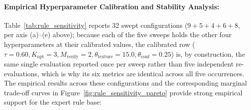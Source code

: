 \documentclass[final,5p,times,twocolumn,authoryear]{elsarticle}
\begin{document}
\paragraph{Empirical Hyperparameter Calibration and Stability Analysis:}
Table~\ref{tab:rule_sensitivity} reports 32 swept configurations ($9+5+4+6+8$, per axis (a)--(e) above); because each of the five sweeps holds the other four hyperparameters at their calibrated values, the calibrated row ($\tau=0.60, K_{\text{opt}}=3, M_{\text{verify}}=2, \theta_{\text{texture}}=15.0, \theta_{\text{conf}}=0.25$) is, by construction, the same single evaluation reported once per sweep rather than five independent re-evaluations, which is why its six metrics are identical across all five occurrences. The empirical results across these configurations and the corresponding marginal trade-off curves in Figure~\ref{fig:rule_sensitivity_pareto} provide strong empirical support for the expert rule base:
\end{document}
